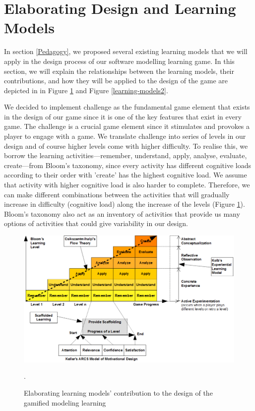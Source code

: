 \documentclass[12pt, a4paper]{report}
\begin{document}
\section{Elaborating Design and Learning Models}
\label{Elaborating Design and Learning Models}
In section \ref{Pedagogy}, we proposed several existing learning models that we will apply in the design process of our software modelling learning game. In this section, we will explain the relationships between the learning models, their contributions, and how they will be applied to the design of the game are depicted in in Figure \ref{learning-models} and Figure \ref{learning-models2}.

We decided to implement challenge as the fundamental game element that exists in the design of our game since it is one of the key features that exist in every game. The challenge is a crucial game element since it stimulates and provokes a player to engage with a game. We translate challenge into series of levels in our design and of course higher levels come with higher difficulty. To realise this, we borrow the learning activities---remember, understand, apply, analyse, evaluate, create---from Bloom's taxonomy, since every activity has different cognitive loads according to their order with 'create' has the highest cognitive load. We assume that activity with higher cognitive load is also harder to complete. Therefore, we can make different combinations between the activities that will gradually increase in difficulty (cognitive load) along the increase of the levels (Figure \ref{learning-models}). Bloom's taxonomy also act as an inventory of activities that provide us many options of activities that could give variability in our design. 

\begin{figure}[ht]
\centering
\includegraphics[width=\textwidth]{learning-models}
\caption{Elaborating learning models' contribution to the design of the gamified modeling learning}.
\label{learning-models}
\end{figure}
\end{document}
